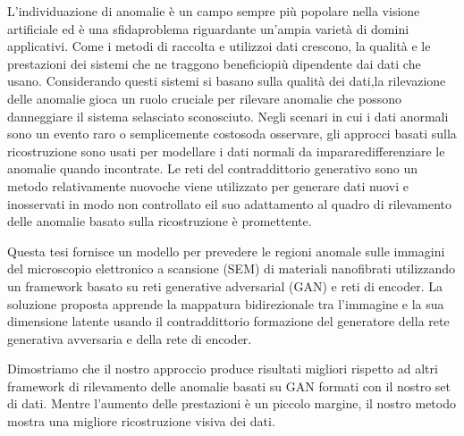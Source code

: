 
\begingroup

L'individuazione di anomalie è un campo sempre più popolare nella visione artificiale ed è una sfidaproblema riguardante un'ampia varietà di domini applicativi. Come i metodi di raccolta e utilizzoi dati crescono, la qualità e le prestazioni dei sistemi che ne traggono beneficiopiù dipendente dai dati che usano. Considerando questi sistemi si basano sulla qualità dei dati,la rilevazione delle anomalie gioca un ruolo cruciale per rilevare anomalie che possono danneggiare il sistema selasciato sconosciuto. Negli scenari in cui i dati anormali sono un evento raro o semplicemente costosoda osservare, gli approcci basati sulla ricostruzione sono usati per modellare i dati normali da impararedifferenziare le anomalie quando incontrate. Le reti del contraddittorio generativo sono un metodo relativamente nuovoche viene utilizzato per generare dati nuovi e inosservati in modo non controllato eil suo adattamento al quadro di rilevamento delle anomalie basato sulla ricostruzione è promettente.

Questa tesi fornisce un modello per prevedere le regioni anomale sulle immagini del microscopio elettronico a scansione (SEM)
di materiali nanofibrati utilizzando un framework basato su reti generative adversarial (GAN) e reti di encoder.
La soluzione proposta apprende la mappatura bidirezionale tra l'immagine e la sua dimensione latente usando il contraddittorio
formazione del generatore della rete generativa avversaria e della rete di encoder.

Dimostriamo che il nostro approccio produce risultati migliori rispetto ad altri framework di rilevamento delle anomalie basati su GAN formati con il nostro
set di dati. Mentre l'aumento delle prestazioni è un piccolo margine, il nostro metodo mostra una migliore ricostruzione visiva dei dati.
\endgroup